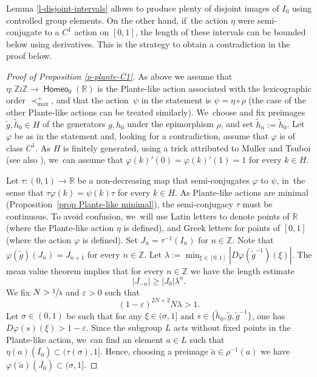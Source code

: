 \documentclass[JEP,XML,SOM,Unicode,NoFloatCountersInSection,published]{cedram}
\theoremstyle{definition}
\DeclareMathOperator{\homeo}{\mathsf{Homeo}}
\newcommand{\R}{\mathbb{R}}
\newcommand{\Z}{\mathbb Z}
\begin{document}
Lemma \ref{l-disjoint-intervals} allows to produce plenty of disjoint images of $I_0$ using controlled group elements. On the other hand, if~the action $\eta$ were semi-conjugate to a $C^1$ action on $[0, 1]$, the length of these intervals can be bounded below using derivatives. This is the strategy to obtain a contradiction in the proof below.

\begin{proof}[Proof of Proposition \ref{p-plante-C1}]
As above we assume that $\eta\colon \Z\wr\Z\to \homeo_0(\R)$ is the Plante-like action associated with the lexicographic order $\prec_{\max}^{+}$, and that the action~$\psi$ in the statement is $\psi=\eta\circ \rho$ (the case of the other Plante-like actions can be treated similarly). We~choose and fix preimages $\widetilde{g}, \widetilde{h}_0\in H$ of the generators $g, h_0$ under the epimorphism $\rho$, and set $\widetilde{h}_n:=\widetilde{h}_0$. Let $\varphi$ be as in the statement and, looking for a contradiction, assume that $\varphi$ is of class $C^1$. As $H$ is finitely generated, using a trick attributed to Muller \cite{Muller} and Tsuboi \cite{Tsuboi} (see also \cite{BMNR}), we~can assume that $\varphi(k)'(0)=\varphi(k)'(1)=1$ for every $k\in H$.

Let $\tau\colon(0, 1)\to \R$ be a non-decreasing map that semi-conjugates $\varphi$ to $\psi$, in~the sense that $\tau\varphi(k)=\psi(k)\tau$ for every $k\in H$. As Plante-like actions are minimal (Proposition~\ref{prop Plante-like minimal}), the semi-conjugacy $\tau$ must be continuous. To avoid confusion, we~will use Latin letters to denote points of $\R$ (where the Plante-like action $\eta$ is defined), and Greek letters for points of $[0, 1]$ (where the action $\varphi$ is defined). Set $J_n=\tau^{-1}(I_n)$ for $n\in \Z$. Note that $\varphi(\tilde{g})(J_n)=J_{n+1}$ for every $n\in \Z$. Let $\lambda:=\min_{\xi\in[0,1]}|D\varphi(\widetilde{g}^{-1})(\xi)|$. The mean value theorem implies that for every $n\in \Z$ we have the length estimate
\begin{equation} |J_{-n}|\geq |J_0|\lambda^{n}. \label{e-Jn}\end{equation}
We fix $N>\sfrac{1}{\lambda}$ and $\varepsilon>0$ such that
\begin{equation} (1-\varepsilon)^{2N+2}N\lambda>1. \label{e-epsilon-choice}
\end{equation}
Let $\sigma\in (0,1)$ be such that for any $\xi\in (\sigma, 1]$ and $s\in \{\widetilde{h}_0, \widetilde{g}, \widetilde{g}^{-1} \}$, one has $ D\varphi(s)(\xi)>1-\varepsilon$. Since the subgroup $L$ acts without fixed points in the Plante-like action, we~can find an element $a\in L$ such that $\eta(a)(\overline{I_0})\subset (\tau(\sigma), 1]$. Hence, choosing a preimage $\widetilde{a}\in \rho^{-1}(a)$ we have $\varphi(\widetilde{a})(\overline{J_0})\subset (\sigma, 1]$.


\end{proof}
\end{document}

